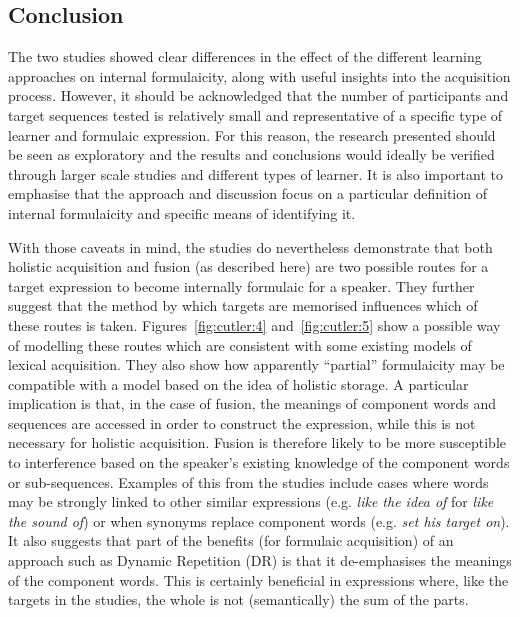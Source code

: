 \documentclass[output=paper]{langscibook}
\begin{document}
\subsection{Conclusion}

The two studies showed clear differences in the effect of the different learning approaches on internal formulaicity, along with useful insights into the acquisition process. However, it should be acknowledged that the number of participants and target sequences tested is relatively small and representative of a specific type of learner and formulaic expression. For this reason, the research presented should be seen as exploratory and the results and conclusions would ideally be verified through larger scale studies and different types of learner. It is also important to emphasise that the approach and discussion focus on a particular definition of internal formulaicity and specific means of identifying it.

With those caveats in mind, the studies do nevertheless demonstrate that both holistic acquisition and fusion (as described here) are two possible routes for a target expression to become internally formulaic for a speaker. They further suggest that the method by which targets are memorised influences which of these routes is taken. Figures~\ref{fig:cutler:4} and~\ref{fig:cutler:5} show a possible way of modelling these routes which are consistent with some existing models of lexical acquisition. They also show how apparently ``partial'' formulaicity may be compatible with a model based on the idea of holistic storage. A particular implication is that, in the case of fusion, the meanings of component words and sequences are accessed in order to construct the expression, while this is not necessary for holistic acquisition. Fusion is therefore likely to be more susceptible to interference based on the speaker’s existing knowledge of the component words or sub-sequences. Examples of this from the studies include cases where words may be strongly linked to other similar expressions (e.g. \textit{like the idea of} for \textit{like the sound of}) or when synonyms replace component words (e.g. \textit{set his target on}). It also suggests that part of the benefits (for formulaic acquisition) of an approach such as Dynamic Repetition (DR) is that it de-emphasises the meanings of the component words. This is certainly beneficial in expressions where, like the targets in the studies, the whole is not (semantically) the sum of the parts.
\end{document}
